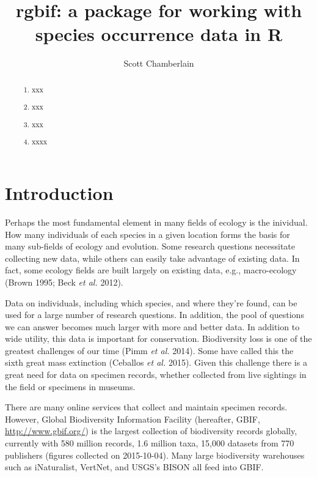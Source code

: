 \documentclass[author-year, review, 11pt]{components/elsarticle} %
\begin{document}
\begin{frontmatter}

  \title{rgbif: a package for working with species occurrence data in R}
    \author[cstar]{Scott Chamberlain}
      \address[cstar]{University of California, Berkeley, CA, USA}    
  
  \begin{abstract}
  \begin{enumerate}
  \def\labelenumi{\arabic{enumi}.}
  \item
    xxx
  \item
    xxx
  \item
    xxx
  \item
    xxxx
  \end{enumerate}
  \end{abstract}
  
 \end{frontmatter}


\section{Introduction}\label{introduction}

Perhaps the most fundamental element in many fields of ecology is the
inividual. How many individuals of each species in a given location
forms the basis for many sub-fields of ecology and evolution. Some
research questions necessitate collecting new data, while others can
easily take advantage of existing data. In fact, some ecology fields are
built largely on existing data, e.g., macro-ecology (Brown 1995; Beck
\emph{et al.} 2012).

Data on individuals, including which species, and where they're found,
can be used for a large number of research questions. In addition, the
pool of questions we can answer becomes much larger with more and better
data. In addition to wide utility, this data is important for
conservation. Biodiversity loss is one of the greatest challenges of our
time (Pimm \emph{et al.} 2014). Some have called this the sixth great
mass extinction (Ceballos \emph{et al.} 2015). Given this challenge
there is a great need for data on specimen records, whether collected
from live sightings in the field or specimens in museums.

There are many online services that collect and maintain specimen
records. However, Global Biodiversity Information Facility (hereafter,
GBIF, \url{http://www.gbif.org/}) is the largest collection of
biodiversity records globally, currently with 580 million records, 1.6
million taxa, 15,000 datasets from 770 publishers (figures collected on
2015-10-04). Many large biodiversity warehouses such as iNaturalist,
VertNet, and USGS's BISON all feed into GBIF.
\end{document}
